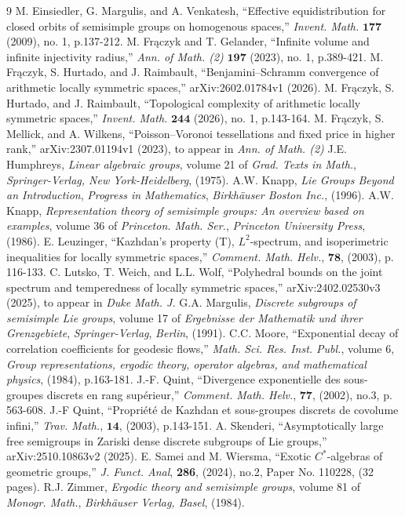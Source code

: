 \documentclass[psamsfonts]{amsart}
\theoremstyle{definition}
\theoremstyle{remark}
\numberwithin{equation}{section}
\begin{document}
\begin{thebibliography}{9}
M. Einsiedler, G. Margulis, and A. Venkatesh, ``Effective equidistribution for closed orbits of semisimple groups on homogenous spaces,'' \emph{Invent. Math.} $\textbf{177}$ (2009), no. 1, p.137-212.
M. Frączyk and T. Gelander, ``Infinite volume and infinite injectivity radius,'' \emph{Ann. of Math. (2)} $\textbf{197}$ (2023), no. 1, p.389-421.
M. Frączyk, S. Hurtado, and J. Raimbault, ``Benjamini--Schramm convergence of arithmetic locally symmetric spaces,'' arXiv:2602.01784v1 (2026).
M. Frączyk, S. Hurtado, and J. Raimbault, ``Topological complexity of arithmetic locally symmetric spaces,'' \emph{Invent. Math.} $\textbf{244}$ (2026), no. 1, p.143-164.
M. Frączyk, S. Mellick, and A. Wilkens, ``Poisson--Voronoi tessellations and fixed price in higher rank,'' arXiv:2307.01194v1 (2023), to appear in \emph{Ann. of Math. (2)}
J.E. Humphreys, \emph{Linear algebraic groups}, volume 21 of \emph{Grad. Texts in Math.}, \emph{Springer-Verlag, New York-Heidelberg}, (1975).
A.W. Knapp, \emph{Lie Groups Beyond an Introduction}, \emph{Progress in Mathematics}, \emph{Birkh\"auser Boston Inc.}, (1996).
A.W. Knapp, \emph{Representation theory of semisimple groups: An overview based on examples}, volume 36 of \emph{Princeton. Math. Ser.}, \emph{Princeton University Press}, (1986).
E. Leuzinger, ``Kazhdan's property (T), $L^2$-spectrum, and isoperimetric inequalities for locally symmetric spaces,'' \emph{Comment. Math. Helv.}, $\textbf{78}$, (2003), p. 116-133.
C. Lutsko, T. Weich, and L.L. Wolf, ``Polyhedral bounds on the joint spectrum and temperedness of locally symmetric spaces,'' arXiv:2402.02530v3 (2025), to appear in \emph{Duke Math. J.}
G.A. Margulis, \emph{Discrete subgroups of semisimple Lie groups}, volume 17 of \emph{Ergebnisse der Mathematik und ihrer Grenzgebiete}, \emph{Springer-Verlag}, \emph{Berlin}, (1991).
C.C. Moore, ``Exponential decay of correlation coefficients for geodesic flows,'' \emph{Math. Sci. Res. Inst. Publ.}, volume 6, \emph{Group representations, ergodic theory, operator algebras, and mathematical physics}, (1984), p.163-181.
J.-F. Quint, ``Divergence exponentielle des sous-groupes discrets en rang sup\'erieur,'' \emph{Comment. Math. Helv.}, $\textbf{77}$, (2002), no.3, p. 563-608.
J.-F Quint, ``Propri\'et\'e de Kazhdan et sous-groupes discrets de covolume infini,'' \emph{Trav. Math.}, $\textbf{14}$, (2003), p.143-151.
A. Skenderi, ``Asymptotically large free semigroups in Zariski dense discrete subgroups of Lie groups,''  arXiv:2510.10863v2 (2025).
E. Samei and M. Wiersma, ``Exotic $C^{*}$-algebras of geometric groups,'' \emph{J. Funct. Anal}, \textbf{286}, (2024), no.2, Paper No. 110228, (32 pages).
R.J. Zimmer, \emph{Ergodic theory and semisimple groups}, volume 81 of \emph{Monogr. Math.}, \emph{Birkh\"auser Verlag, Basel}, (1984).
\end{thebibliography}
\end{document}
